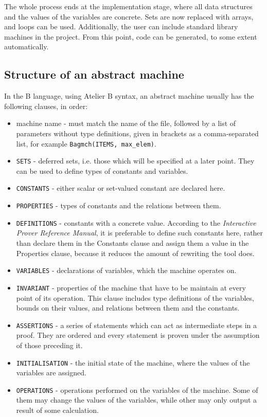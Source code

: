 \documentclass[12pt,journal,duplex]{IEEEtran}
\begin{document}
	The whole process ends at the implementation stage, where all data structures and the values of the variables are concrete. Sets are now replaced with arrays, and loops can be used. Additionally, the user can include standard library machines in the project. From this point, code can be generated, to some extent automatically.

	\subsection{Structure of an abstract machine}
	In the B language, using Atelier B syntax, an abstract machine usually has the following clauses, in order:
	\begin{itemize}
		\item machine name - must match the name of the file, followed by a list of parameters without type definitions, given in brackets as a comma-separated list, for example \texttt{Bagmch(ITEMS, max\_elem)}.
		\item \texttt{SETS} - deferred sets, i.e. those which will be specified at a later point. They can be used to define types of constants and variables.
		\item \texttt{CONSTANTS} - either scalar or set-valued constant are declared here.
		\item \texttt{PROPERTIES} - types of constants and the relations between them.
		\item \texttt{DEFINITIONS} - constants with a concrete value. According to the \emph{Interactive Prover Reference Manual}, it is preferable to define such constants here, rather than declare them in the Constants clause and assign them a value in the Properties clause, because it reduces the amount of rewriting the tool does.\cite{Prover guide}
		\item \texttt{VARIABLES} - declarations of variables, which the machine operates on.
		\item \texttt{INVARIANT} - properties of the machine that have to be maintain at every point of its operation. This clause includes type definitions of the variables, bounds on their values, and relations between them and the constants.
		\item \texttt{ASSERTIONS} - a series of statements which can act as intermediate steps in a proof. They are ordered and every statement is proven under the assumption of those preceding it.
		\item \texttt{INITIALISATION} - the initial state of the machine, where the values of the variables are assigned.
		\item \texttt{OPERATIONS} - operations performed on the variables of the machine. Some of them may change the values of the variables, while other may only output a result of some calculation.
	\end{itemize}
\end{document}
